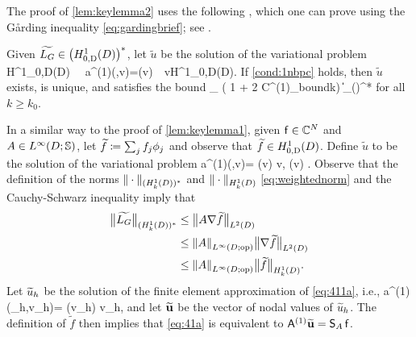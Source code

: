 The proof of \cref{lem:keylemma2} uses the following , which one can prove using the G\aa rding inequality \cref{eq:gardingbrief}; see \cite[Lemma 5.1]{GrPeSp:19}.

\label{lem:H1}
Given $\widetilde{\LG}\in \HozDDs$, let $\widetilde{u}$ be the solution of the variational problem
\beqs
{} \,\, \in H^1_{0,D}(D) \,\,\tst \,\,
a^{(1)}(,v)=\widetilde{\LG}(v) \,\, \tfa v\in H^1_{0,D}(D).
\eeqs
If \cref{cond:1nbpc} holds, then $\widetilde{u}$ exists, is unique, and satisfies the bound
\beq\label{eq:bound2}
_{\HokD} \leq {}\left( 1 + 2 C^{(1)}_{\rm bound}\nsomax  k\right) \big\|\widetilde{\LG}\big\|_{(\HokD)^*}
\eeq
for all $k\geq k_0$.
\ele


In a similar way to the proof of \cref{lem:keylemma1}, given $\mathsf{f} \in \mathbb C^N$ and $A\in \LiDRRdtd$, let $\widetilde{f} \coloneqq \sum_j f_j \phi_j$ and observe that $\widetilde{f} \in \HozDD$. Define $\widetilde{u}$ to be the solution of the variational problem 
\beq\label{eq:411a}
a^{(1)}(,v)= \widetilde{\LG}(v) \quad{} v\in \HozDD,
\quad{} \quad
 \widetilde{\LG}(v) \de {}.
\eeq
Observe that the definition of the norms $\|\cdot\|_{(\HokD)^*}$ and $\|\cdot\|_{\HokD}$ \cref{eq:weightednorm} and the Cauchy-Schwarz inequality imply that
\begin{align}
\big\| \widetilde{\LG}\big\|_{(\HokD)^*}&\leq \big\|A\nabla \widetilde{f}\big\|_{\LtD}\nonumber\\
&\leq \NLiDRRdtd{A} \big\|\nabla \widetilde{f}\big\|_{\LtD}\label{eq:Fbounda}\\
&\leq \NLiDRRdtd{A} \big\| \widetilde{f}\big\|_{\HokD}.\label{eq:Fbound}
\end{align}
Let $\widetilde{u}_h$ be the solution of the finite element approximation of \cref{eq:411a}, i.e.,
\beq\label{eq:41a}
a^{(1)}(\tu_h,v_h)= \widetilde{\LG}(v_h) \quad{} v_h\in \Vhp,
\eeq
and let $\widetilde{\mathbf{u}}$ be the vector of nodal values of $\widetilde{u}_h$. The definition of $\widetilde{f}$ then implies that \cref{eq:41a} is equivalent to $\mathsf{A}^{(1)} \widetilde{\mathbf{u}} = \mathsf{S}_A\,\mathsf{f}$. 

